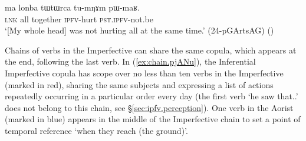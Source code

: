 \begin{exe}
\ex \label{ex:tumNAm.pWmaR}
\gll  ma lonba tɯtɯrca tu-mŋɤm pɯ-maʁ. \\
\textsc{lnk} all together \textsc{ipfv}-hurt \textsc{pst}.\textsc{ipfv}-not.be \\
\glt `[My whole head] was not hurting all at the same time.' (24-pGArtsAG)
()
\end{exe}

Chains of verbs in the Imperfective can share the same copula, which appears at the end, following the last verb. In (\ref{ex:chain.pjANu}), the Inferential Imperfective copula  has scope over no less than ten verbs in the Imperfective (marked in red), sharing the same subjects and expressing a list of actions repeatedly occurring in a particular order every day (the first verb  `he saw that..' does not belong to this chain, see §\ref{sec:ipfv.perception}). One verb in the Aorist (marked in blue) appears in the middle of the Imperfective chain to set a point of temporal reference `when they reach (the ground)'.

